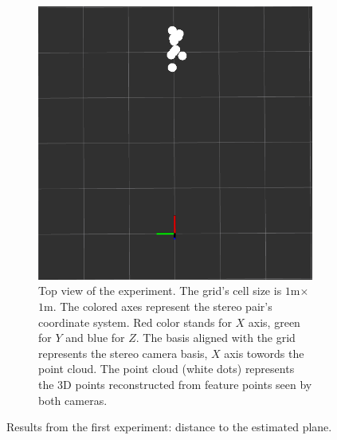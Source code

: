 \begin{figure}[ht]
\begin{subfigure}[ht]{0.49\textwidth}
    \includegraphics[width=\textwidth]{graphics/experiment_1_4m.png}
    \caption[Top view of the experiment.]{Top view of the experiment. 
    The grid's cell size is $1$m$\times$$1$m.
    The colored axes represent the stereo pair's coordinate system.
    Red color stands for $X$ axis, green for $Y$ and blue for $Z$.
    The basis aligned with the grid represents the stereo camera basis, $X$ axis towords the point cloud.
    The point cloud (white dots) represents the 3D points reconstructed from feature points seen by both cameras.}
    \label{fig:exp_1_topview}
  \end{subfigure}
  \caption{Results from the first experiment: distance to the estimated plane.}
  \label{fig:exp_1_exp}
\end{figure}

